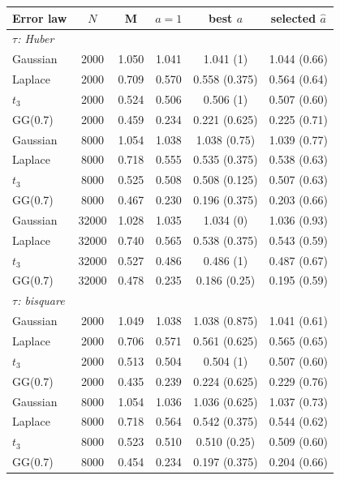 \begin{tabular}{lccccc}
\toprule
Error law & $N$ & M & $a=1$ & best $a$ & selected $\hat a$ \\
\midrule
\multicolumn{6}{l}{\emph{$\tau$: Huber}} \\
Gaussian & 2000 & 1.050 & 1.041 & 1.041 (1) & 1.044 (0.66) \\
Laplace & 2000 & 0.709 & 0.570 & 0.558 (0.375) & 0.564 (0.64) \\
$t_3$ & 2000 & 0.524 & 0.506 & 0.506 (1) & 0.507 (0.60) \\
GG(0.7) & 2000 & 0.459 & 0.234 & 0.221 (0.625) & 0.225 (0.71) \\
Gaussian & 8000 & 1.054 & 1.038 & 1.038 (0.75) & 1.039 (0.77) \\
Laplace & 8000 & 0.718 & 0.555 & 0.535 (0.375) & 0.538 (0.63) \\
$t_3$ & 8000 & 0.525 & 0.508 & 0.508 (0.125) & 0.507 (0.63) \\
GG(0.7) & 8000 & 0.467 & 0.230 & 0.196 (0.375) & 0.203 (0.66) \\
Gaussian & 32000 & 1.028 & 1.035 & 1.034 (0) & 1.036 (0.93) \\
Laplace & 32000 & 0.740 & 0.565 & 0.538 (0.375) & 0.543 (0.59) \\
$t_3$ & 32000 & 0.527 & 0.486 & 0.486 (1) & 0.487 (0.67) \\
GG(0.7) & 32000 & 0.478 & 0.235 & 0.186 (0.25) & 0.195 (0.59) \\
\multicolumn{6}{l}{\emph{$\tau$: bisquare}} \\
Gaussian & 2000 & 1.049 & 1.038 & 1.038 (0.875) & 1.041 (0.61) \\
Laplace & 2000 & 0.706 & 0.571 & 0.561 (0.625) & 0.565 (0.65) \\
$t_3$ & 2000 & 0.513 & 0.504 & 0.504 (1) & 0.507 (0.60) \\
GG(0.7) & 2000 & 0.435 & 0.239 & 0.224 (0.625) & 0.229 (0.76) \\
Gaussian & 8000 & 1.054 & 1.036 & 1.036 (0.625) & 1.037 (0.73) \\
Laplace & 8000 & 0.718 & 0.564 & 0.542 (0.375) & 0.544 (0.62) \\
$t_3$ & 8000 & 0.523 & 0.510 & 0.510 (0.25) & 0.509 (0.60) \\
GG(0.7) & 8000 & 0.454 & 0.234 & 0.197 (0.375) & 0.204 (0.66) \\

\end{tabular}
